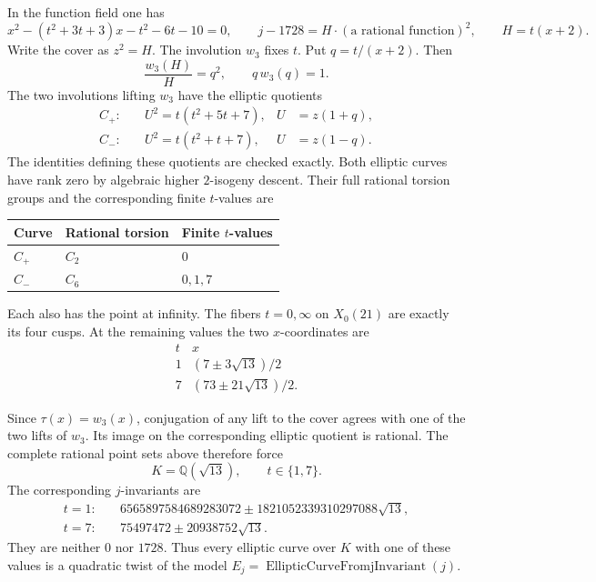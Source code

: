 \documentclass[
  11pt,
]{article}
\newcounter{none} %
\begin{document}
In the function field one has \[
x^2-(t^2+3t+3)x-t^2-6t-10=0,
\qquad j-1728=H\cdot(\text{a rational function})^2,
\qquad H=t(x+2).
\] Write the cover as \(z^2=H\). The involution \(w_3\) fixes \(t\). Put
\(q=t/(x+2)\). Then \[
\frac{w_3(H)}{H}=q^2,\qquad q\,w_3(q)=1.
\] The two involutions lifting \(w_3\) have the elliptic quotients \[
\begin{aligned}
C_+:&\quad U^2=t(t^2+5t+7),& U&=z(1+q),\\
C_-:&\quad U^2=t(t^2+t+7),& U&=z(1-q).
\end{aligned}
\] The identities defining these quotients are checked exactly. Both
elliptic curves have rank zero by algebraic higher \(2\)-isogeny
descent. Their full rational torsion groups and the corresponding finite
\(t\)-values are

{\def\LTcaptype{none} %
\begin{longtable}[]{@{}lll@{}}
\toprule\noalign{}
Curve & Rational torsion & Finite \(t\)-values \\
\midrule\noalign{}
\endhead
\bottomrule\noalign{}
\endlastfoot
\(C_+\) & \(C_2\) & \(0\) \\
\(C_-\) & \(C_6\) & \(0,1,7\) \\
\end{longtable}
}

Each also has the point at infinity. The fibers \(t=0,\infty\) on
\(X_0(21)\) are exactly its four cusps. At the remaining values the two
\(x\)-coordinates are \[
\begin{array}{c|c}
t&x\\\hline
1&(7\pm3\sqrt{13})/2\\
7&(73\pm21\sqrt{13})/2.
\end{array}
\]

Since \(\tau(x)=w_3(x)\), conjugation of any lift to the cover agrees
with one of the two lifts of \(w_3\). Its image on the corresponding
elliptic quotient is rational. The complete rational point sets above
therefore force \[
K=\mathbb Q(\sqrt{13}),\qquad t\in\{1,7\}.
\] The corresponding \(j\)-invariants are \[
\begin{aligned}
t=1:&\quad6565897584689283072\pm1821052339310297088\sqrt{13},\\
t=7:&\quad75497472\pm20938752\sqrt{13}.
\end{aligned}
\] They are neither \(0\) nor \(1728\). Thus every elliptic curve over
\(K\) with one of these values is a quadratic twist of the model
\(E_j=\operatorname{EllipticCurveFromjInvariant}(j)\).
\end{document}
